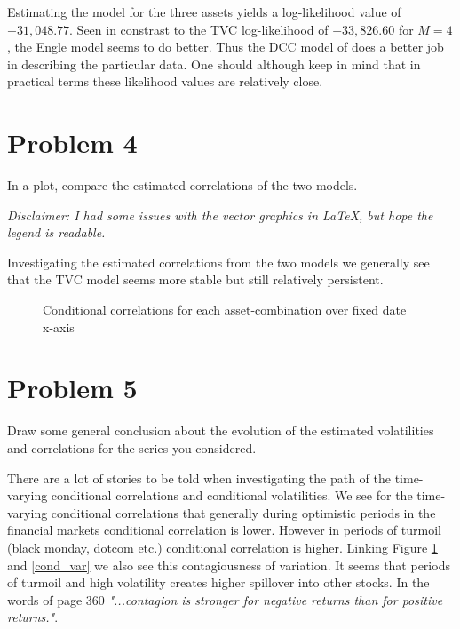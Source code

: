 \documentclass{EconHomework}
\begin{document}
Estimating the \cite{engle2002} model for the three assets yields a log-likelihood value of $-31,048.77$. Seen in constrast to the TVC log-likelihood of $-33,826.60$ for $M=4$, the Engle model seems to do better. Thus the DCC model of \cite{engle2002} does a better job in describing the particular data. One should although keep in mind that in practical terms these likelihood values are relatively close.


\section{Problem 4}
\begin{tcolorbox}[colback=white]
    In a plot, compare the estimated correlations of the two models.
\end{tcolorbox}

\textit{Disclaimer: I had some issues with the vector graphics in LaTeX, but hope the legend is readable.}

\bigskip

Investigating the estimated correlations from the two models we generally see that the TVC model seems more stable but still relatively persistent.

\begin{figure}[htbp]
  \centering
  
  \caption{Conditional correlations for each asset-combination over fixed date x-axis}
  \label{cond_corr}
\end{figure}

\pagebreak

\section{Problem 5}
\begin{tcolorbox}[colback=white]
    Draw some general conclusion about the evolution of the estimated volatilities and correlations for the series you considered.
\end{tcolorbox}

There are a lot of stories to be told when investigating the path of the time-varying conditional correlations and conditional volatilities. We see for the time-varying conditional correlations that generally during optimistic periods in the financial markets conditional correlation is lower. However in periods of turmoil (black monday, dotcom etc.) conditional correlation is higher. Linking Figure  \ref{cond_corr} and \ref{cond_var} we also see this contagiousness of variation. It seems that periods of turmoil and high volatility creates higher spillover into other stocks. In the words of \cite{tsetsui2002} page 360 \textit{"...contagion is stronger for negative returns than for positive returns."}.
\end{document}
